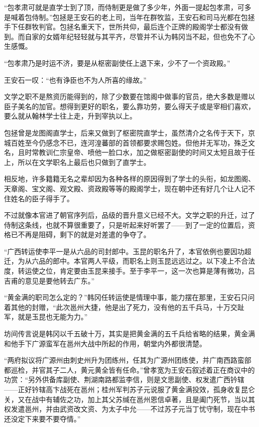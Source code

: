 “包孝肃可就是直学士到了顶，而侍制更是做了多少年，外面一提起包孝肃，可多是喊着包侍制。”包拯是王安石的老上司，当年在群牧监，王安石和司马光都在包拯手下任群牧判官。包拯名重天下，世所共仰，最后连个正牌的殿阁学士都没有做到。而自家的女婿年纪轻轻就与其平齐，尽管并不认为韩冈当不起，但也免不了心生感慨。

“包孝肃乃是时运不济，要是从枢密副使任上退下来，少不了一个资政殿。”

王安石一叹：“也有诤臣也不为人所喜的缘故。”

文学之职不是熬资历能得到的，除了少数要在馆阁中做事的官员，绝大多数是赠以臣子美名的加官。想得到更好的职名，要么靠功劳，要么得天子或是宰相们喜欢，要么就从翰林学士往上走，升到宰执以上。

包拯曾是龙图阁直学士，后来又做到了枢密院直学士，虽然清介之名传于天下，京城百姓至今仍感念不已，连河湟蕃部的首领都要求赐包姓。但他并无军功，殊乏文名，且时常教训仁宗皇帝、喷他一脸口水，加之做枢密副使的时间又太短且故于任上，所以在文学职名上最后也只做到了直学士。

相反地，许多籍籍无名之辈却因为各种各样的原因得到了学士的头衔，如龙图阁、天章阁、宝文阁、观文殿、资政殿等等的殿阁学士，现在朝中还有好几个让人记不住姓名的臣子得手了。

不过就像本官进了朝官序列后，品级的晋升意义已经不大。文学之职的升迁，过了侍制这条线，也就不算很重要了，只是听起来好听罢了——到了一定的位置后，资格已不再是阻碍，剩下的就是对差遣的争夺了。

“广西转运使李平一是从六品的司封郎中。玉昆的职名升了，本官依例也要因功超迁，为从六品的郎中。本官两人平级，而职名上则玉昆远远过之。以下凌上不合法度，转运使之位，肯定要由玉昆来接手。至于李平一，这一次也算是薄有微功，吕吉甫的意见是要他转去广东。”

“黄金满的职司怎么定的？”韩冈任转运使是情理中事，能力摆在那里，王安石只问着其他的封赠，“此次邕州大捷，他是出了死力，没有他的五千兵马，十万交趾军，就是玉昆也无能为力。”

坊间传言说是韩冈以千五破十万，其实是把黄金满的五千兵给省略的结果，黄金满和他手下广源蛮军在邕州大战中所起的作用，朝堂内外都很清楚。

“两府拟议将广源州由刺史州升为团练州，任其为广源州团练使，并广南西路蛮部都巡检，并官其子二人，黄元黄全皆有任命。”曾孝宽为王安石叙述着正在商议中的功赏：“另外供备库副使、荆湖南路都监李信，则是文思副使、权发遣广西钤辖——正好钤辖高卞战死在邕州；桂州军判苏子元说服了黄金满投效，孤身收复昆仑关，又在战中有辅佐之功，加上其父苏缄在邕州恩信卓著，且是阖门死节，当以其权发遣邕州，并由武资改文资、为太子中允——不过苏子元当丁忧守制，现在中书还没定下来要不要夺情。”

